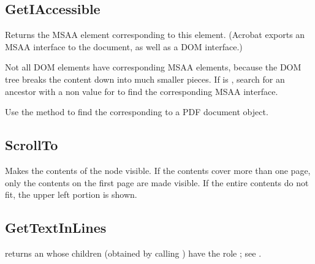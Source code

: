 \documentclass[letterpaper,12pt,english,openany,oneside]{sphinxmanual}
\begin{document}
\subsection{GetIAccessible}
\label{\detokenize{Access_DOM:getiaccessible}}
Returns the MSAA  element corresponding to this element. (Acrobat exports an MSAA interface to the document, as well as a DOM interface.)

Not all DOM elements have corresponding MSAA elements, because the DOM tree breaks the content down into much smaller pieces. If  is  , search for an ancestor with a non\sphinxhyphen{} value for  to find the corresponding MSAA interface.

Use the method  to find the  corresponding to a PDF document  object.

\begin{sphinxVerbatim}[commandchars=\\\{\}]
   
\end{sphinxVerbatim}


\subsection{ScrollTo}
\label{\detokenize{Access_DOM:scrollto}}
Makes the contents of the node visible. If the contents cover more than one page, only the contents on the first page are made visible. If the entire contents do not fit, the upper left portion is shown.

\begin{sphinxVerbatim}[commandchars=\\\{\}]
 
\end{sphinxVerbatim}




\subsection{GetTextInLines}
\label{\detokenize{Access_DOM:gettextinlines}}
 returns an  whose children (obtained by calling  ) have the role  ; see .
\end{document}
